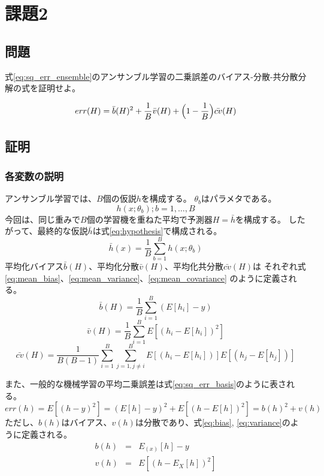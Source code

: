 \documentclass{jsarticle}
\begin{document}
\section{課題2}
\subsection{問題}
式\ref{eq:sq_err_ensemble}のアンサンブル学習の二乗誤差のバイアス-分散-共分散分解の式を証明せよ。

\begin{equation}
    err(H) = \bar{b}(H)^2 + \frac{1}{B}\bar{v}(H) + \Bigl(1-\frac{1}{B}\Bigr) \bar{cv}(H)
    \label{eq:sq_err_ensemble}
\end{equation}

\subsection{証明}
\subsubsection{各変数の説明}
アンサンブル学習では、$B$個の仮説$h$を構成する。
$\theta_b$はパラメタである。
$$ {h(x;\theta_b);b=1, \ldots, B} $$
今回は、同じ重みで$B$個の学習機を重ねた平均で予測器$H=\bar{h}$を構成する。
したがって、最終的な仮説$\bar{h}$は式\ref{eq:hypothesis}で構成される。
\begin{equation}
    \bar{h}(x) = \frac{1}{B} \sum_{b=1}^B{h(x;\theta_b)}
    \label{eq:hypothesis}
\end{equation}
平均化バイアス$\bar{b}(H)$、平均化分散$\bar{v}(H)$、平均化共分散$\bar{cv}(H)$は
それぞれ式\ref{eq:mean_bias}、\ref{eq:mean_variance}、\ref{eq:mean_covariance}
のように定義される。
\begin{equation}
    \bar{b}(H)=\frac{1}{B}\sum_{i=1}^B{(E[h_i]-y)}
    \label{eq:mean_bias}
\end{equation}
\begin{equation}
    \bar{v}(H)=\frac{1}{B}\sum_{i=1}^B{E[(h_i-E[h_i])^2]}
    \label{eq:mean_variance}
\end{equation}
\begin{equation}
    \bar{cv}(H)=\frac{1}{B(B-1)}\sum_{i=1}^B\sum_{j=1,j\neq i}^B{E[(h_i-E[h_i])]E[(h_j-E[h_j])]}
    \label{eq:mean_covariance}
\end{equation}

また、一般的な機械学習の平均二乗誤差は式\ref{eq:sq_err_basis}のように表される。
\begin{equation}
    err(h)=E[(h-y)^2]=(E[h]-y)^2+E[(h-E[h])^2]=b(h)^2+v(h)
    \label{eq:sq_err_basis}
\end{equation}
ただし、$b(h)$はバイアス、$v(h)$は分散であり、式\ref{eq:bias}, \ref{eq:variance}のように定義される。
\begin{eqnarray}
    \label{eq:bias}
    b(h)&=&E_{(x)}[h]-y\\
    \label{eq:variance}
    v(h)&=&E[(h-E_X[h])^2]
\end{eqnarray}
\end{document}
